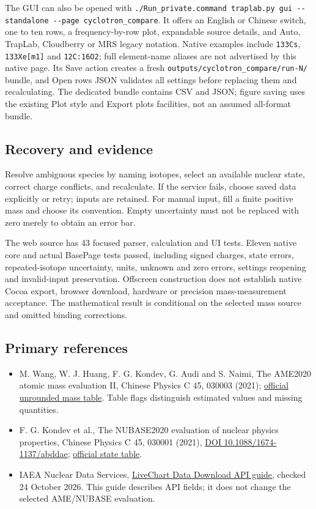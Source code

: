 \documentclass[
  aps,
  onecolumn,
  11pt]{revtex4-2}
\providecommand{\tightlist}{%
  \setlength{\itemsep}{0pt}\setlength{\parskip}{0pt}}
\begin{document}
The GUI can also be opened with
\texttt{./Run\_private.command\ traplab.py\ gui\ -\/-standalone\ -\/-page\ cyclotron\_compare}.
It offers an English or Chinese switch, one to ten rows, a
frequency-by-row plot, expandable source details, and Auto, TrapLab,
Cloudberry or MRS legacy notation. Native examples include
\texttt{133Cs}, \texttt{133Xe{[}m1{]}} and \texttt{12C:16O2}; full
element-name aliases are not advertised by this native page. Its Save
action creates a fresh \texttt{outputs/cyclotron\_compare/run-N/}
bundle, and Open rows JSON validates all settings before replacing them
and recalculating. The dedicated bundle contains CSV and JSON; figure
saving uses the existing Plot style and Export plots facilities, not an
assumed all-format bundle.

\subsection{Recovery and evidence}\label{recovery-and-evidence}

Resolve ambiguous species by naming isotopes, select an available
nuclear state, correct charge conflicts, and recalculate. If the service
fails, choose saved data explicitly or retry; inputs are retained. For
manual input, fill a finite positive mass and choose its convention.
Empty uncertainty must not be replaced with zero merely to obtain an
error bar.

The web source has 43 focused parser, calculation and UI tests. Eleven
native core and actual BasePage tests passed, including signed charges,
state errors, repeated-isotope uncertainty, units, unknown and zero
errors, settings reopening and invalid-input preservation. Offscreen
construction does not establish native Cocoa export, browser download,
hardware or precision mass-measurement acceptance. The mathematical
result is conditional on the selected mass source and omitted binding
corrections.

\subsection{Primary references}\label{primary-references}

\begin{itemize}
\tightlist
\item
  M. Wang, W. J. Huang, F. G. Kondev, G. Audi and S. Naimi, The AME2020
  atomic mass evaluation II, Chinese Physics C 45, 030003 (2021);
  \href{https://www-nds.iaea.org/amdc/ame2020/mass_1.mas20.txt}{official
  unrounded mass table}. Table flags distinguish estimated values and
  missing quantities.
\item
  F. G. Kondev et al., The NUBASE2020 evaluation of nuclear physics
  properties, Chinese Physics C 45, 030001 (2021),
  \href{https://doi.org/10.1088/1674-1137/abddae}{DOI
  10.1088/1674-1137/abddae};
  \href{https://www-nds.iaea.org/amdc/ame2020/nubase_4.mas20.txt}{official
  state table}.
\item
  IAEA Nuclear Data Services,
  \href{https://www-nds.iaea.org/relnsd/vcharthtml/api_v0_guide.html}{LiveChart
  Data Download API guide}, checked 24 October 2026. This guide
  describes API fields; it does not change the selected AME/NUBASE
  evaluation.
\end{itemize}
\end{document}
